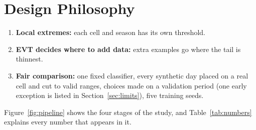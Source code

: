 \documentclass[12pt,a4paper]{report}
\begin{document}
\section{Design Philosophy}
\begin{enumerate}
  \item \textbf{Local extremes:} each cell and season has its own threshold.
  \item \textbf{EVT decides where to add data:} extra examples go where the tail is thinnest.
  \item \textbf{Fair comparison:} one fixed classifier, every synthetic day placed on a real cell and cut to valid ranges, choices made on a
        validation period (one early exception is listed in Section~\ref{sec:limits}), five training seeds.
\end{enumerate}

Figure~\ref{fig:pipeline} shows the four stages of the study, and Table~\ref{tab:numbers} explains every number
that appears in it.
\end{document}
